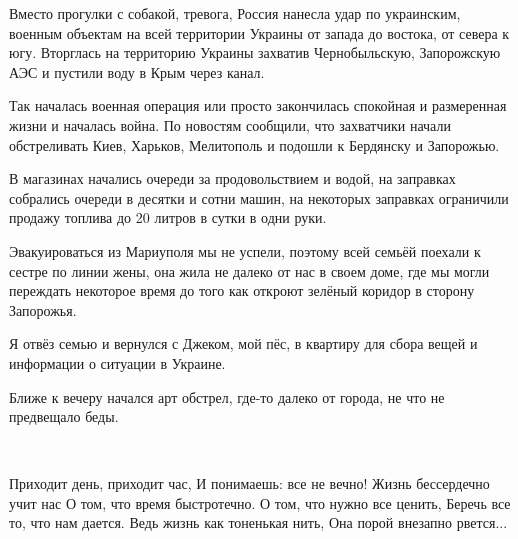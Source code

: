Вместо прогулки с собакой,  тревога, Россия нанесла удар по украинским, военным
объектам на всей территории Украины от запада до востока, от севера к югу.
Вторглась на территорию Украины захватив Чернобыльскую, Запорожскую АЭС и
пустили воду в Крым через канал.

Так началась военная операция или просто закончилась спокойная и размеренная
жизни и началась война. По новостям сообщили, что захватчики начали
обстреливать Киев, Харьков, Мелитополь и подошли к  Бердянску и Запорожью.

В магазинах начались очереди за продовольствием и водой, на заправках собрались
очереди в  десятки и сотни машин, на некоторых заправках ограничили продажу
топлива до 20 литров в сутки в одни руки.

Эвакуироваться из Мариуполя мы не успели, поэтому всей семьёй поехали к сестре
по линии жены, она жила не далеко от нас в своем доме, где мы могли переждать
некоторое время до того как откроют зелёный коридор в сторону Запорожья.

Я отвёз семью и вернулся с Джеком, мой пёс, в  квартиру для сбора вещей и
информации о ситуации в Украине.

Ближе к вечеру начался арт обстрел, где-то далеко от города, не что не предвещало беды.

🙏

\obeycr
Приходит день, приходит час,
И понимаешь: все не вечно!
Жизнь бессердечно учит нас
О том, что время быстротечно.
О том, что нужно все ценить,
Беречь все то, что нам дается.
Ведь жизнь как тоненькая нить,
Она порой внезапно рвется...
\restorecr
